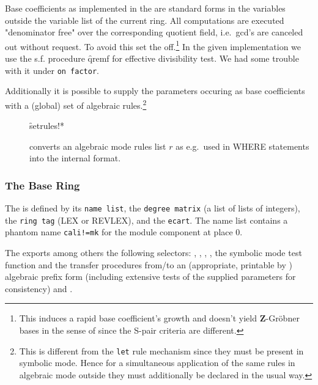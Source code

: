 Base coefficients as implemented in the  are standard
forms in the variables outside the variable list of the current
ring. All computations are executed "denominator free" over the
corresponding quotient field, i.e.\ gcd's are canceled out without
request. To avoid this set the  off.\footnote{This
induces a rapid base coefficient's growth and doesn't yield \textbf{Z}-Gr\"obner
bases in the sense of \cite{Gianni:88} since the S-pair criteria are
different.} In the given implementation we use the s.f. procedure
\f{qremf} for effective divisibility test. We had some trouble with it
under \texttt{on factor}.

Additionally it is possible to supply the
parameters occuring as base coefficients with a (global) set of
algebraic rules.\footnote{This is different from the \texttt{let} rule
mechanism since they must be present in symbolic mode. Hence for a
simultaneous application of the same rules in algebraic mode outside
 they must additionally be declared in the usual way.}
\begin{description}
\item[]
  \hypertarget{procedure:SETRULES!*}{}
  \begin{syntax}
    \f{setrules!*} 
  \end{syntax}
converts an algebraic mode rules list $r$ as e.g.\ used in
WHERE statements into the internal  format.
\end{description}

\subsubsection{The Base Ring}

The  is defined by its \texttt{name list}, the
\texttt{degree matrix} (a list of lists of integers), the \texttt{ring tag} (LEX
or REVLEX), and the \texttt{ecart}. The name list contains a phantom
name \texttt{cali!=mk} for the module component at place 0.
\medskip

The  exports among others the following selectors:
, ,
,
, the symbolic mode test function  and the
transfer procedures from/to an (appropriate, printable by
) algebraic prefix form  (including
extensive tests of the supplied parameters for consistency) and
.

